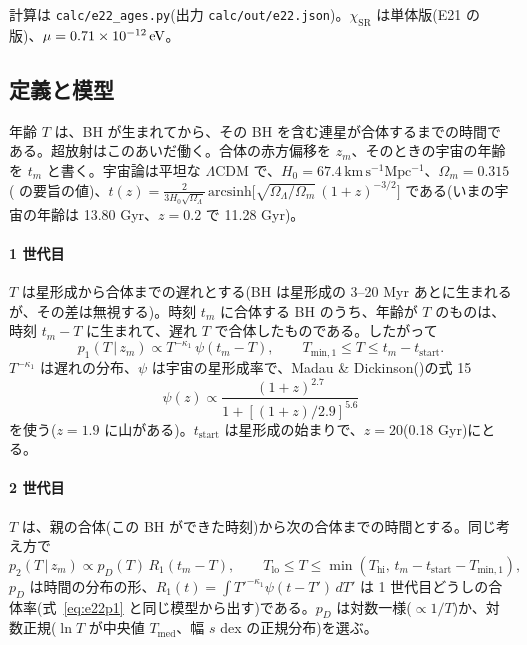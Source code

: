 計算は \texttt{calc/e22\_ages.py}(出力 \texttt{calc/out/e22.json})。$\chi_\mathrm{SR}$ は単体版(E21 の版)、$\mu=0.71\times10^{-12}\,\mathrm{eV}$。

\subsection{定義と模型}

年齢 $T$ は、BH が生まれてから、その BH を含む連星が合体するまでの時間である。超放射はこのあいだ働く。合体の赤方偏移を $z_m$、そのときの宇宙の年齢を $t_m$ と書く。宇宙論は平坦な $\Lambda$CDM で、$H_0=67.4\,\mathrm{km\,s^{-1}Mpc^{-1}}$、$\Omega_m=0.315$( の要旨の値)、$t(z)=\frac{2}{3H_0\sqrt{\Omega_\Lambda}}\,\mathrm{arcsinh}\bigl[\sqrt{\Omega_\Lambda/\Omega_m}\,(1+z)^{-3/2}\bigr]$ である(いまの宇宙の年齢は 13.80 Gyr、$z=0.2$ で 11.28 Gyr)。

\paragraph{1 世代目}
$T$ は星形成から合体までの遅れとする(BH は星形成の 3--20 Myr あとに生まれるが、その差は無視する)。時刻 $t_m$ に合体する BH のうち、年齢が $T$ のものは、時刻 $t_m-T$ に生まれて、遅れ $T$ で合体したものである。したがって
\begin{equation}
p_1(T\,|\,z_m)\propto T^{-\kappa_1}\,\psi(t_m-T),\qquad T_\mathrm{min,1}\le T\le t_m-t_\mathrm{start}.
\label{eq:e22p1}
\end{equation}
$T^{-\kappa_1}$ は遅れの分布、$\psi$ は宇宙の星形成率で、Madau \& Dickinson()の式 15
\begin{equation}
\psi(z)\propto\frac{(1+z)^{2.7}}{1+[(1+z)/2.9]^{5.6}}
\end{equation}
を使う($z=1.9$ に山がある)。$t_\mathrm{start}$ は星形成の始まりで、$z=20$(0.18 Gyr)にとる。

\paragraph{2 世代目}
$T$ は、親の合体(この BH ができた時刻)から次の合体までの時間とする。同じ考え方で
\begin{equation}
p_2(T\,|\,z_m)\propto p_D(T)\,R_1(t_m-T),\qquad T_\mathrm{lo}\le T\le\min(T_\mathrm{hi},\,t_m-t_\mathrm{start}-T_\mathrm{min,1}),
\label{eq:e22p2}
\end{equation}
$p_D$ は時間の分布の形、$R_1(t)=\int T'^{-\kappa_1}\psi(t-T')\,dT'$ は 1 世代目どうしの合体率(式~\eqref{eq:e22p1} と同じ模型から出す)である。$p_D$ は対数一様($\propto1/T$)か、対数正規($\ln T$ が中央値 $T_\mathrm{med}$、幅 $s$ dex の正規分布)を選ぶ。

